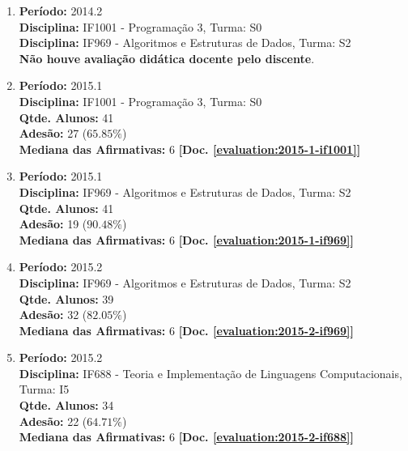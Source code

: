 \documentclass[a4paper,oneside,10pt]{article}
\begin{document}
\begin{enumerate}
\renewcommand{\labelenumi}{{\large\bfseries\arabic{enumi}.}}

\item   \textbf{Período:} 2014.2 \\
        \textbf{Disciplina:} IF1001 - Programação 3, Turma: S0\\
        \textbf{Disciplina:} IF969 - Algoritmos e Estruturas de Dados, Turma: S2\\
        \textbf{Não houve avaliação didática docente pelo discente}.

\item   \textbf{Período:} 2015.1 \\
        \textbf{Disciplina:} IF1001 - Programação 3, Turma: S0\\
        \textbf{Qtde. Alunos:} 41\\
        \textbf{Adesão:} 27 ($65.85\%$)\\
        \textbf{Mediana das Afirmativas:} 6 \textbf{[Doc. \ref{evaluation:2015-1-if1001}]}

\item   \textbf{Período:} 2015.1 \\
        \textbf{Disciplina:} IF969 - Algoritmos e Estruturas de Dados, Turma: S2\\
        \textbf{Qtde. Alunos:} 41\\
        \textbf{Adesão:} 19 ($90.48\%$)\\
        \textbf{Mediana das Afirmativas:} 6 \textbf{[Doc. \ref{evaluation:2015-1-if969}]}

\item   \textbf{Período:} 2015.2 \\
        \textbf{Disciplina:} IF969 - Algoritmos e Estruturas de Dados, Turma: S2\\
        \textbf{Qtde. Alunos:} 39\\
        \textbf{Adesão:} 32 ($82.05\%$)\\
        \textbf{Mediana das Afirmativas:} 6 \textbf{[Doc. \ref{evaluation:2015-2-if969}]}

\item   \textbf{Período:} 2015.2 \\
        \textbf{Disciplina:} IF688 - Teoria e Implementação de Linguagens Computacionais, Turma: I5\\
        \textbf{Qtde. Alunos:} 34\\
        \textbf{Adesão:} 22 ($64.71\%$)\\
        \textbf{Mediana das Afirmativas:} 6 \textbf{[Doc. \ref{evaluation:2015-2-if688}]}


\end{enumerate}
\end{document}
